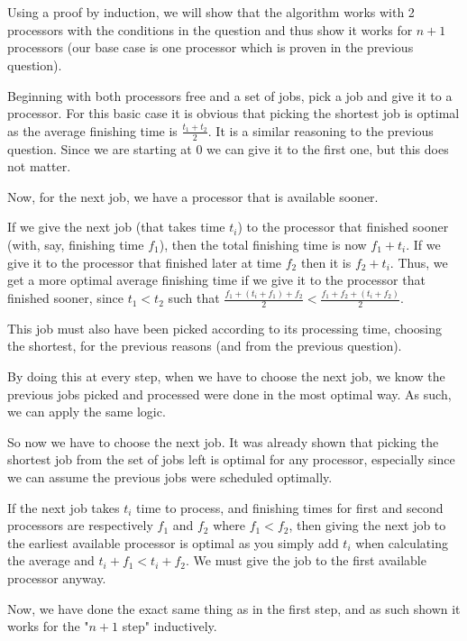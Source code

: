 \documentclass[11pt,letterpaper]{article}
\begin{document}
	\section{}
		Using a proof by induction, we will show that the algorithm works with 2 processors with the conditions in the question and thus show it works for $n+1$ processors (our base case is one processor which is proven in the previous question).
		
		Beginning with both processors free and a set of jobs, pick a job and give it to a processor. For this basic case it is obvious that picking the shortest job is optimal as the average finishing time is $\frac{t_1 + t_2}{2}$. It is a similar reasoning to the previous question.
		Since we are starting at 0 we can give it to the first one, but this does not matter.
		
		Now, for the next job, we have a processor that is available sooner.
		
		If we give the next job (that takes time $t_i$) to the processor that finished sooner (with, say, finishing time $f_1$), then the total finishing time is now $f_1 + t_i$.
		If we give it to the processor that finished later at time $f_2$ then it is $f_2 + t_i$.
		Thus, we get a more optimal average finishing time if we give it to the processor that finished sooner, since $t_1 < t_2$ such that $\frac{f_1+(t_i+f_1)+f_2}{2} < \frac{f_1+f_2+(t_i+f_2)}{2}$.
		
		This job must also have been picked according to its processing time, choosing the shortest, for the previous reasons (and from the previous question).
		
		By doing this at every step, when we have to choose the next job, we know the previous jobs picked and processed were done in the most optimal way.
		As such, we can apply the same logic.
		
		So now we have to choose the next job. It was already shown that picking the shortest job from the set of jobs left is optimal for any processor, especially since we can assume the previous jobs were scheduled optimally.
		
		If the next job takes $t_i$ time to process, and finishing times for first and second processors are respectively $f_1$ and $f_2$ where $f_1 < f_2$, then giving the next job to the earliest available processor is optimal as you simply add $t_i$ when calculating the average and $t_i+f_1 < t_i+f_2$. We must give the job to the first available processor anyway.
		
		Now, we have done the exact same thing as in the first step, and as such shown it works for the "$n+1$ step" inductively.
		
\end{document}
